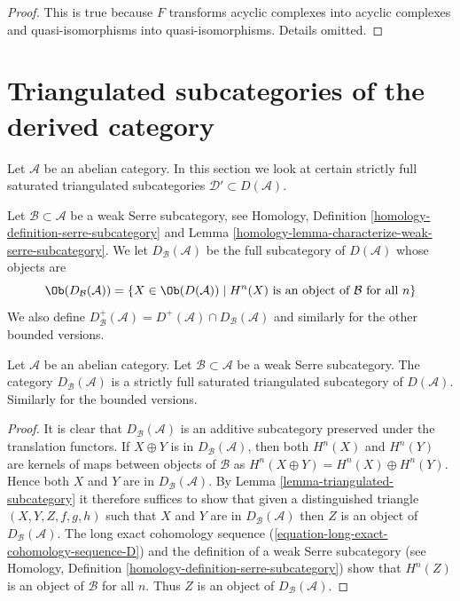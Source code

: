 \begin{proof}
This is true because $F$ transforms acyclic complexes into acyclic complexes
and quasi-isomorphisms into quasi-isomorphisms. Details omitted.
\end{proof}









\section{Triangulated subcategories of the derived category}
\label{section-triangulated-sub}

\noindent
Let $\mathcal{A}$ be an abelian category. In this section we look at
certain strictly full saturated triangulated subcategories
$\mathcal{D}' \subset D(\mathcal{A})$.

\medskip\noindent
Let $\mathcal{B} \subset \mathcal{A}$ be a weak Serre subcategory, see
Homology, Definition \ref{homology-definition-serre-subcategory} and
Lemma \ref{homology-lemma-characterize-weak-serre-subcategory}.
We let $D_\mathcal{B}(\mathcal{A})$ be the full subcategory of
$D(\mathcal{A})$ whose objects are
$$
\Ob(D_\mathcal{B}(\mathcal{A}))
=
\{X \in \Ob(D(\mathcal{A})) \mid
H^n(X) \text{ is an object of }\mathcal{B}\text{ for all }n\}
$$
We also define
$D^{+}_\mathcal{B}(\mathcal{A}) =
D^{+}(\mathcal{A}) \cap D_\mathcal{B}(\mathcal{A})$
and similarly for the other bounded versions.

\begin{lemma}
\label{lemma-cohomology-in-serre-subcategory}
Let $\mathcal{A}$ be an abelian category.
Let $\mathcal{B} \subset \mathcal{A}$ be a weak Serre subcategory.
The category $D_\mathcal{B}(\mathcal{A})$ is a strictly full
saturated triangulated subcategory of $D(\mathcal{A})$.
Similarly for the bounded versions.
\end{lemma}

\begin{proof}
It is clear that $D_\mathcal{B}(\mathcal{A})$ is an additive subcategory
preserved under the translation functors.
If $X \oplus Y$ is in $D_\mathcal{B}(\mathcal{A})$, then
both $H^n(X)$ and $H^n(Y)$ are kernels of maps between objects
of $\mathcal{B}$ as $H^n(X \oplus Y) = H^n(X) \oplus H^n(Y)$.
Hence both $X$ and $Y$ are in $D_\mathcal{B}(\mathcal{A})$. By
Lemma \ref{lemma-triangulated-subcategory}
it therefore suffices to show that given a distinguished triangle
$(X, Y, Z, f, g, h)$ such that $X$ and $Y$ are in $D_\mathcal{B}(\mathcal{A})$
then $Z$ is an object of $D_\mathcal{B}(\mathcal{A})$. The long exact
cohomology sequence (\ref{equation-long-exact-cohomology-sequence-D})
and the definition of a weak Serre subcategory (see
Homology, Definition \ref{homology-definition-serre-subcategory})
show that $H^n(Z)$ is an object of $\mathcal{B}$ for all $n$.
Thus $Z$ is an object of $D_\mathcal{B}(\mathcal{A})$.
\end{proof}

